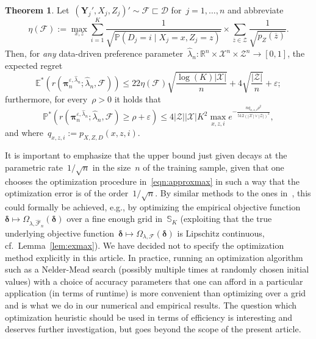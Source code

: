 \documentclass[11pt, a4paper]{article}
\newcommand{\R}{\mathbb{R}}
\theoremstyle{definition}
\newtheorem{theorem}{Theorem}[section]
\begin{document}
\begin{theorem}\label{thm:upreg2}
Let~$(\bm{Y}_j', X_j, Z_j)' \sim \mathcal{F} \sqsubset \mathscr{D}$ for~$j =1, \hdots, n$ and abbreviate
%
\begin{equation}
\eta(\mathcal{F}) := \max_{x, z} \sum_{i = 1}^K\frac{1}{ \sqrt{\mathbb{P}\left(D_j = i \mid X_j = x, Z_j = z\right)}} \times \sum_{\overline{z} \in \mathcal{Z}} \frac{1}{\sqrt{p_Z(\overline{z})}}.
\end{equation} 
Then, for \emph{any} data-driven preference parameter~$  \hat{\lambda}_n: \R^n \times \mathcal{X}^n \times \mathcal{Z}^n \to [0, 1]$, the expected regret 
\begin{equation}\label{eqn:regupmain}
\mathbb{E}^*\left(r(\bm{\pi}^{\varepsilon,   \hat{\lambda}_n}_n;   \hat{\lambda}_n, \mathcal{F}) \right) \leq 22 \eta(\mathcal{F}) \sqrt{ \frac{\log(K)|\mathcal{X}|}{n}}  +  4 \sqrt{\frac{|\mathcal{Z}|}{n}} + \varepsilon;
\end{equation}  
%
furthermore, for every~$\rho > 0$ it holds that
%
\begin{equation}\label{eqn:hprobreg}
\mathbb{P}^*\left(
r(\bm{\pi}^{\varepsilon,  \hat{\lambda}_n}_n;  \hat{\lambda}_n, \mathcal{F})
\geq \rho + \varepsilon
\right) \leq 4 | \mathcal{Z}||\mathcal{X}|K^2 \max_{x, z, i}  e^{- \frac{nq_{x,z,i} \rho^2}{512(|\mathcal{X}| \vee |\mathcal{Z}|)^2}},
\end{equation}
%
and where~$q_{x,z,i} := p_{X, Z, D}(x, z, i)$.
\end{theorem}

It is important to emphasize that the upper bound just given decays at the parametric rate~$1/\sqrt{n}$ in the size~$n$ of the training sample, given that one chooses the optimization procedure in~\eqref{eqn:approxmax} in such a way that the optimization error is of the order~$1/\sqrt{n}$. By similar methods to the ones in~\cite{kpv3}, this could formally be achieved, e.g., by optimizing the empirical objective function~$\bm{\delta} \mapsto \Omega_{\lambda, \hat{\mathcal{F}}_n}(\bm{\delta})$ over a fine enough grid in~$\mathbb{S}_K$ (exploiting that the true underlying objective function~$\bm{\delta} \mapsto \Omega_{\lambda, \mathcal{F}}(\bm{\delta})$ is Lipschitz continuous, cf.~Lemma~\ref{lem:exmax}). We have decided not to specify the optimization method explicitly in this article. In practice, running an optimization algorithm such as a Nelder-Mead search (possibly multiple times at randomly chosen initial values) with a choice of accuracy parameters that one can afford in a particular application (in terms of runtime) is more convenient than optimizing over a grid and is what we do in our numerical and empirical results. The question which optimization heuristic should be used in terms of efficiency is interesting and deserves further investigation, but goes beyond the scope of the present article.
\end{document}
